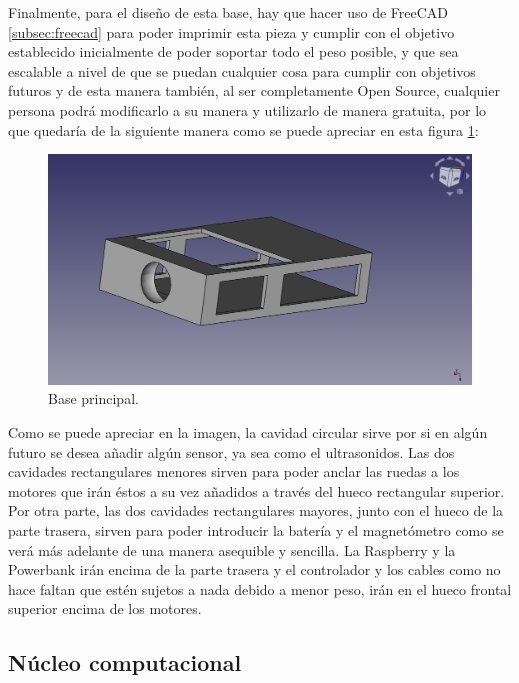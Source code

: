 Finalmente, para el diseño de esta base, hay que hacer uso de FreeCAD \ref{subsec:freecad} para poder imprimir esta pieza y cumplir con el objetivo establecido inicialmente de poder soportar todo el peso posible, y que sea escalable a nivel de que se puedan cualquier cosa para cumplir con objetivos futuros y de esta manera también, al ser completamente Open Source, cualquier persona podrá modificarlo a su manera y utilizarlo de manera gratuita, por lo que quedaría de la siguiente manera como se puede apreciar en esta figura \ref{fig:Base_principal}:

\begin{figure}[H]
  \centering
  \includegraphics[scale=0.25]{figs/base} %
  \caption{Base principal.}
  \label{fig:Base_principal}
\end{figure}

Como se puede apreciar en la imagen, la cavidad circular sirve por si en algún futuro se desea añadir algún sensor, ya sea como el ultrasonidos. Las dos cavidades rectangulares menores sirven para poder anclar las ruedas a los motores que irán éstos a su vez añadidos a través del hueco rectangular superior. Por otra parte, las dos cavidades rectangulares mayores, junto con el hueco de la parte trasera, sirven para poder introducir la batería y el magnetómetro como se verá más adelante de una manera asequible y sencilla. La Raspberry y la Powerbank irán encima de la parte trasera y el controlador y los cables como no hace faltan que estén sujetos a nada debido a menor peso, irán en el hueco frontal superior encima de los motores.


\subsection{Núcleo computacional}
\label{subsec:plataforma_hardware}


